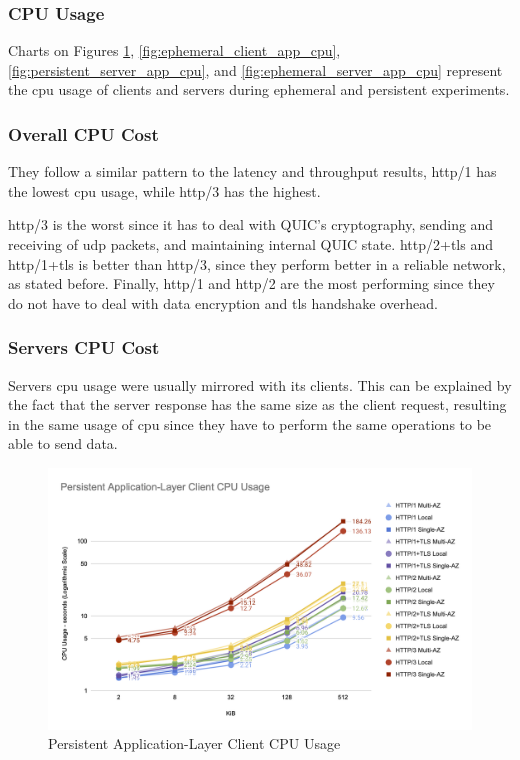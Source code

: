 \subsubsection{CPU Usage}

Charts on Figures \ref{fig:persistent_client_app_cpu}, \ref{fig:ephemeral_client_app_cpu}, \ref{fig:persistent_server_app_cpu}, and \ref{fig:ephemeral_server_app_cpu} represent the \gls{cpu} usage of clients and servers during ephemeral and persistent experiments.

\subsubsection*{Overall CPU Cost}

They follow a similar pattern to the latency and throughput results, \gls{http}/1 has the lowest \gls{cpu} usage, while \gls{http}/3 has the highest.

\gls{http}/3 is the worst since it has to deal with QUIC’s cryptography, sending and receiving of \gls{udp} packets, and maintaining internal QUIC state. \gls{http}/2+\gls{tls} and \gls{http}/1+\gls{tls} is better than \gls{http}/3, since they perform better in a reliable network, as stated before. Finally, \gls{http}/1 and \gls{http}/2 are the most performing since they do not have to deal with data encryption and \gls{tls}  handshake overhead.

\subsubsection*{Servers CPU Cost}

Servers \gls{cpu} usage were usually mirrored with its clients. This can be explained by the fact that the server response has the same size as the client request, resulting in the same usage of \gls{cpu} since they have to perform the same operations to be able to send data.

\clearpage

\begin{figure}[h!]
    \centering
    \includegraphics[width=\linewidth]{figures/charts/Persistent Application-Layer Client CPU Usage.png}
    \caption{Persistent Application-Layer Client CPU Usage}
    \label{fig:persistent_client_app_cpu}
\end{figure}

